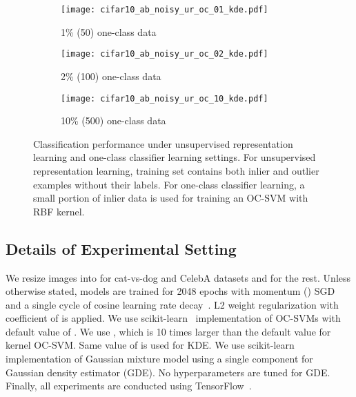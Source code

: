 \documentclass{article} \usepackage{iclr2021_conference,times}
\begin{document}
\begin{figure}[t]
    \centering
    \begin{subfigure}{.32\textwidth}
        \centering
        \texttt{[image: cifar10\_ab\_noisy\_ur\_oc\_01\_kde.pdf]}
        \caption{1\% (50) one-class data}
        \label{fig:ab_noisy_ur_oc_01_kde}
    \end{subfigure}
    \begin{subfigure}{.32\textwidth}
        \centering
        \texttt{[image: cifar10\_ab\_noisy\_ur\_oc\_02\_kde.pdf]}
        \caption{2\% (100) one-class data}
        \label{fig:ab_noisy_ur_oc_02_kde}
    \end{subfigure}
    \begin{subfigure}{.32\textwidth}
        \centering
        \texttt{[image: cifar10\_ab\_noisy\_ur\_oc\_10\_kde.pdf]}
        \caption{10\% (500) one-class data}
        \label{fig:ab_noisy_ur_oc_05_kde}
    \end{subfigure}
    \caption{Classification performance under unsupervised representation learning and one-class classifier learning settings. For unsupervised representation learning, training set contains both inlier and outlier examples without their labels. For one-class classifier learning, a small portion of inlier data is used for training an OC-SVM with RBF kernel.}
    \label{fig:ab_noisy_setting_clean_detector}
\end{figure}

\subsection{Details of Experimental Setting}
\label{sec:exp_protocol}
We resize images into  for cat-vs-dog and CelebA datasets and  for the rest. 
Unless otherwise stated, models are trained for 2048 epochs with momentum () SGD and a single cycle of cosine learning rate decay~\citep{loshchilov2016sgdr}. L2 weight regularization with coefficient of  is applied. 
We use scikit-learn~\citep{scikit-learn} implementation of OC-SVMs with default value of . We use , which is 10 times larger than the default value for kernel OC-SVM. Same value of  is used for KDE. 
We use scikit-learn implementation of Gaussian mixture model using a single component for Gaussian density estimator (GDE). No hyperparameters are tuned for GDE.
Finally, all experiments are conducted using TensorFlow~\citep{abadi2016tensorflow}. 
\end{document}
